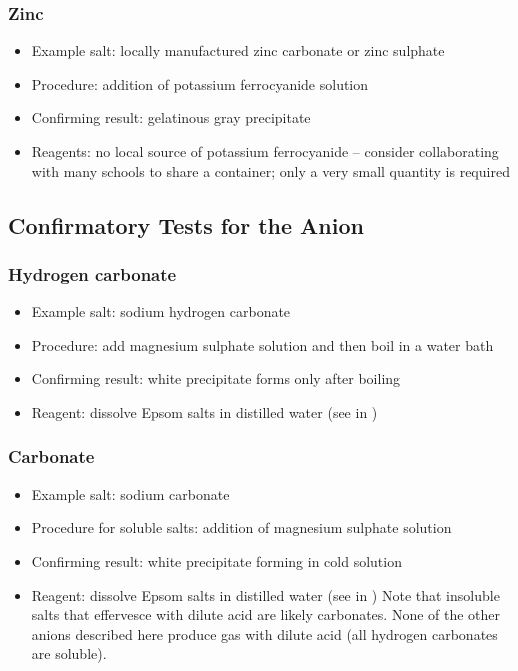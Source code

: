 \subsubsection{Zinc}
\begin{itemize}
\item{Example salt: locally manufactured zinc carbonate 
or zinc sulphate}
\item{Procedure: addition of potassium ferrocyanide solution}
\item{Confirming result: gelatinous gray precipitate}
\item{Reagents: no local source of potassium ferrocyanide -- 
consider collaborating with many schools to share a container; 
only a very small quantity is required}
\end{itemize}

\subsection{Confirmatory Tests for the Anion} 

\subsubsection{Hydrogen carbonate}
\begin{itemize}
\item{Example salt: sodium hydrogen carbonate}
\item{Procedure: add magnesium sulphate solution 
and then boil in a water bath}
\item{Confirming result: white precipitate forms only after boiling}
\item{Reagent: dissolve Epsom salts in distilled water 
(see  in )}
\end{itemize}

\subsubsection{Carbonate}
\begin{itemize}
\item{Example salt: sodium carbonate}
\item{Procedure for soluble salts: addition of magnesium sulphate solution}
\item{Confirming result: white precipitate forming in cold solution}
\item{Reagent: dissolve Epsom salts in distilled water 
(see  in )}
Note that insoluble salts that effervesce 
with dilute acid are likely carbonates. 
None of the other anions described here produce gas with dilute acid 
(all hydrogen carbonates are soluble).
\end{itemize}

